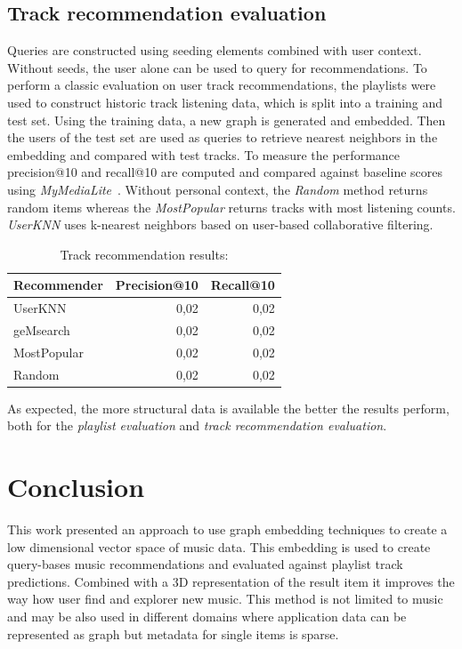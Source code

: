 \documentclass[sigconf]{acmart}
\begin{document}
\subsection{Track recommendation evaluation}
\label{subsec:track_rec_eval}
Queries are constructed using seeding elements combined with user context. Without seeds, the user alone can be used to query for recommendations. To perform a classic evaluation on user track recommendations, the playlists were used to construct historic track listening data, which is split into a training and test set. Using the training data, a new graph is generated and embedded. Then the users of the test set are used as queries to retrieve nearest neighbors in the embedding and compared with test tracks. To measure the performance precision@10 and recall@10 are computed and compared against baseline scores using \emph{MyMediaLite}~\cite{Gantner2011MyMediaLite}. Without personal context, the \emph{Random} method returns random items whereas the \emph{MostPopular} returns tracks with most listening counts. \emph{UserKNN} uses k-nearest neighbors based on user-based collaborative filtering. 




\begin{table}[H]
	\caption{Track recommendation results:}
	\label{table:track_rec_results}
	\begin{tabular}{lrr}
		\midrule 
		\textbf{Recommender} & \textbf{Precision@10} & \textbf{Recall@10} \\ 
		\midrule 
		UserKNN   & 0,02 & 0,02  \\
		geMsearch   & 0,02 & 0,02  \\
		MostPopular   & 0,02 & 0,02  \\
		Random   & 0,02 & 0,02  \\
		\bottomrule
	\end{tabular}
\end{table}

As expected, the more structural data is available the better the results perform, both for the \emph{playlist evaluation} and \emph{track recommendation evaluation}.

\section{Conclusion}
This work presented an approach to use graph embedding techniques to create a low dimensional vector space of music data. This embedding is used to create query-bases music recommendations and evaluated against playlist track predictions. Combined with a 3D representation of the result item it improves the way how user find and explorer new music. 
This method is not limited to music and may be also used in different domains where application data can be represented as graph but metadata for single items is sparse.
\end{document}
